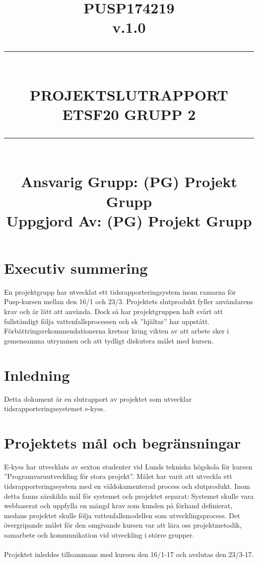 \documentclass[paper=a4, fontsize=11pt,twoside]{article}
\title{
		\documentNumber{#1}																						
		\documentVersion{#2}																				
		\HRule{0.5pt} \\ %
		\LARGE \textbf{\uppercase{#3}} \\
		\large \textbf{\uppercase{ETSF20 Grupp 2}} 
		\HRule{2pt} \\ [1.5cm]    
		\normalsize            
		\documentResponsible{#4} \\ 
		\documentCreator{#4}  
	}
\newcommand{\HRule}[1]{\rule{\linewidth}{#1}}
\newcommand{\documentNumber}[1]{\centering PUSP1742#1 \\[1.0cm]}
\newcommand{\documentVersion}[1]{\centering \small{v.#1} \\[1.0cm]}
\newcommand{\documentResponsible}[1]{\centering  Ansvarig Grupp: #1}
\newcommand{\documentCreator}[1]{\centering Uppgjord Av: #1}
\newcommand{\grouptitlepage}[4]{ 
	\title{
		\documentNumber{#1}																						
		\documentVersion{#2}																				
		\HRule{0.5pt} \\ %
		\LARGE \textbf{\uppercase{#3}} \\
		\large \textbf{\uppercase{ETSF20 Grupp 2}} 
		\HRule{2pt} \\ [1.5cm]    
		\normalsize            
		\documentResponsible{#4} \\ 
		\documentCreator{#4}  
	}																							
	\maketitle																							
	\thispagestyle{empty} 																					
	\newpage 
}
\begin{document}
\grouptitlepage
{19}
{1.0}
{Projektslutrapport}
{(PG) Projekt Grupp}
\tableofcontents

\section{Executiv summering}
En projektgrupp har utvecklat ett tidsrapporteringsystem inom ramarna för 
Pusp-kursen mellan den 16/1 och 23/3. Projektets slutprodukt fyller användarens 
krav och är lätt att använda. Dock så har projektgruppen haft svårt att
fullständigt följa vattenfallsprocessen och sk ”hjältar” har uppstått. 
Förbättringsrekommendationerna kretsar kring vikten av att arbete sker i 
gemensamma utrymmen och att tydligt diskutera målet med kursen.
\section{Inledning}
Detta dokument är en slutrapport av projektet som utvecklar
tidsrapporteringssystemet e-kyss.
\section{Projektets mål och begränsningar}
E-kyss har utvecklats av sexton studenter vid Lunds tekniska högskola för kursen 
”Programvaruutveckling för stora projekt”. Målet har varit att utveckla ett 
tidsrapporteringssystem med en väldokumenterad process och slutprodukt. 
Inom detta fanns särskilda mål för systemet och projektet separat: Systemet 
skulle vara webbaserat och uppfylla en mängd krav som kunden på förhand definierat, 
medans projektet skulle följa vattenfallsmodellen som utvecklingsprocess.
Det övergripande målet för den omgivande kursen var att lära oss projektmetodik, 
samarbete och kommunikation vid utveckling i större grupper.\\
\\
Projektet inleddes tillsammans med kursen den 16/1-17 och avslutas den 23/3-17.
\newpage
\end{document}
